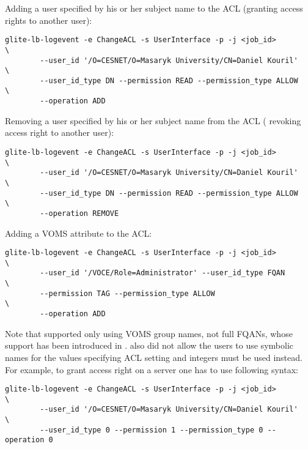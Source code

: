 Adding a user specified by his or her subject name to the ACL (\ie granting
access rights to another user):

\begin{verbatim}
glite-lb-logevent -e ChangeACL -s UserInterface -p -j <job_id>          \
        --user_id '/O=CESNET/O=Masaryk University/CN=Daniel Kouril'     \
        --user_id_type DN --permission READ --permission_type ALLOW     \
        --operation ADD
\end{verbatim}


Removing a user specified by his or her subject name from the ACL (\ie
revoking access right to another user):

\begin{verbatim}
glite-lb-logevent -e ChangeACL -s UserInterface -p -j <job_id>          \
        --user_id '/O=CESNET/O=Masaryk University/CN=Daniel Kouril'     \
        --user_id_type DN --permission READ --permission_type ALLOW     \
        --operation REMOVE
\end{verbatim}


Adding a VOMS attribute to the ACL:

\begin{verbatim}
glite-lb-logevent -e ChangeACL -s UserInterface -p -j <job_id>          \
        --user_id '/VOCE/Role=Administrator' --user_id_type FQAN        \
        --permission TAG --permission_type ALLOW                       \
        --operation ADD
\end{verbatim}


Note that  supported only using VOMS group names, not full FQANs,
whose support has been introduced in .  also did not
allow the users to use symbolic names for the values specifying ACL
setting and integers must be used instead. For example, to grant access
right on a \LBver{1.x} server one has to use following syntax:

\begin{verbatim}
glite-lb-logevent -e ChangeACL -s UserInterface -p -j <job_id>          \
        --user_id '/O=CESNET/O=Masaryk University/CN=Daniel Kouril'     \
        --user_id_type 0 --permission 1 --permission_type 0 --operation 0
\end{verbatim}

